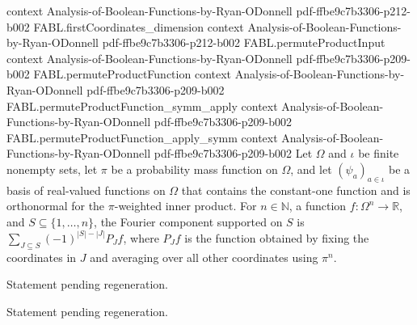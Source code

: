 \begin{theorem}
  {context}
  {Analysis-of-Boolean-Functions-by-Ryan-ODonnell}
  {pdf-ffbe9c7b3306-p212-b002}
\proofstep
  {FABL.firstCoordinates_dimension}
  {context}
  {Analysis-of-Boolean-Functions-by-Ryan-ODonnell}
  {pdf-ffbe9c7b3306-p212-b002}
\proofstep
  {FABL.permuteProductInput}
  {context}
  {Analysis-of-Boolean-Functions-by-Ryan-ODonnell}
  {pdf-ffbe9c7b3306-p209-b002}
\proofstep
  {FABL.permuteProductFunction}
  {context}
  {Analysis-of-Boolean-Functions-by-Ryan-ODonnell}
  {pdf-ffbe9c7b3306-p209-b002}
\proofstep
  {FABL.permuteProductFunction_symm_apply}
  {context}
  {Analysis-of-Boolean-Functions-by-Ryan-ODonnell}
  {pdf-ffbe9c7b3306-p209-b002}
\proofstep
  {FABL.permuteProductFunction_apply_symm}
  {context}
  {Analysis-of-Boolean-Functions-by-Ryan-ODonnell}
  {pdf-ffbe9c7b3306-p209-b002}
Let $\Omega$ and $\iota$ be finite nonempty sets, let $\pi$ be a probability mass
function on $\Omega$, and let $(\psi_a)_{a\in\iota}$ be a basis of real-valued functions
on $\Omega$ that contains the constant-one function and is orthonormal for the
$\pi$-weighted inner product. For $n\in\mathbb N$, a function $f:\Omega^n\to\mathbb R$,
and $S\subseteq\{1,\ldots,n\}$, the Fourier component supported on $S$ is
$\sum_{J\subseteq S}(-1)^{|S|-|J|}P_Jf$, where $P_Jf$ is the function obtained by fixing
the coordinates in $J$ and averaging over all other coordinates using $\pi^n$.
\end{theorem}

\begin{theorem}
\label{FABL.orthogonalComponent_basis_independent}
\leanok
{}
Statement pending regeneration.
\end{theorem}

\begin{theorem}
\label{FABL.FiniteFourierBasis.orthogonalComponent_add_of_uniqueness}
\leanok
{}
Statement pending regeneration.
\end{theorem}

